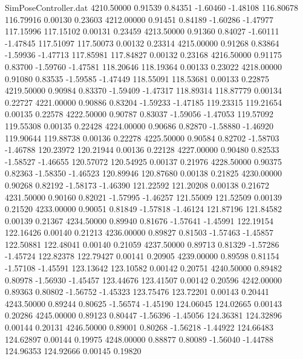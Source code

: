 \begin{filecontents}{SimPoseController.dat}
4210.50000    0.91539    0.84351    -1.60460   -1.48108  116.80678  116.79916    0.00130    0.23603
4212.00000    0.91451    0.84189    -1.60286   -1.47977  117.15996  117.15102    0.00131    0.23459
4213.50000    0.91360    0.84027    -1.60111   -1.47845  117.51097  117.50073    0.00132    0.23314
4215.00000    0.91268    0.83864    -1.59936   -1.47713  117.85981  117.84827    0.00132    0.23168
4216.50000    0.91175    0.83700    -1.59760   -1.47581  118.20646  118.19364    0.00133    0.23022
4218.00000    0.91080    0.83535    -1.59585   -1.47449  118.55091  118.53681    0.00133    0.22875
4219.50000    0.90984    0.83370    -1.59409   -1.47317  118.89314  118.87779    0.00134    0.22727
4221.00000    0.90886    0.83204    -1.59233   -1.47185  119.23315  119.21654    0.00135    0.22578
4222.50000    0.90787    0.83037    -1.59056   -1.47053  119.57092  119.55308    0.00135    0.22428
4224.00000    0.90686    0.82870    -1.58880   -1.46920  119.90644  119.88738    0.00136    0.22278
4225.50000    0.90584    0.82702    -1.58703   -1.46788  120.23972  120.21944    0.00136    0.22128
4227.00000    0.90480    0.82533    -1.58527   -1.46655  120.57072  120.54925    0.00137    0.21976
4228.50000    0.90375    0.82363    -1.58350   -1.46523  120.89946  120.87680    0.00138    0.21825
4230.00000    0.90268    0.82192    -1.58173   -1.46390  121.22592  121.20208    0.00138    0.21672
4231.50000    0.90160    0.82021    -1.57995   -1.46257  121.55009  121.52509    0.00139    0.21520
4233.00000    0.90051    0.81849    -1.57818   -1.46124  121.87196  121.84582    0.00139    0.21367
4234.50000    0.89940    0.81676    -1.57641   -1.45991  122.19154  122.16426    0.00140    0.21213
4236.00000    0.89827    0.81503    -1.57463   -1.45857  122.50881  122.48041    0.00140    0.21059
4237.50000    0.89713    0.81329    -1.57286   -1.45724  122.82378  122.79427    0.00141    0.20905
4239.00000    0.89598    0.81154    -1.57108   -1.45591  123.13642  123.10582    0.00142    0.20751
4240.50000    0.89482    0.80978    -1.56930   -1.45457  123.44676  123.41507    0.00142    0.20596
4242.00000    0.89363    0.80802    -1.56752   -1.45323  123.75476  123.72201    0.00143    0.20441
4243.50000    0.89244    0.80625    -1.56574   -1.45190  124.06045  124.02665    0.00143    0.20286
4245.00000    0.89123    0.80447    -1.56396   -1.45056  124.36381  124.32896    0.00144    0.20131
4246.50000    0.89001    0.80268    -1.56218   -1.44922  124.66483  124.62897    0.00144    0.19975
4248.00000    0.88877    0.80089    -1.56040   -1.44788  124.96353  124.92666    0.00145    0.19820

\end{filecontents}
